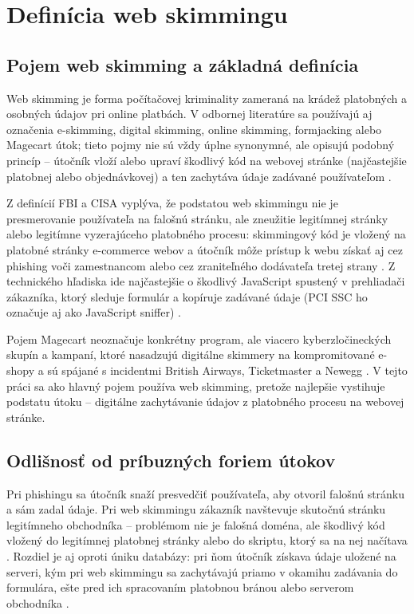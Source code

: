 \section{Definícia web skimmingu}

\subsection{Pojem web skimming a základná definícia}

Web skimming je forma počítačovej kriminality zameraná na krádež platobných a osobných údajov pri online platbách. V odbornej literatúre sa používajú aj označenia e-skimming, digital skimming, online skimming, formjacking alebo Magecart útok; tieto pojmy nie sú vždy úplne synonymné, ale opisujú podobný princíp -- útočník vloží alebo upraví škodlivý kód na webovej stránke (najčastejšie platobnej alebo objednávkovej) a ten zachytáva údaje zadávané používateľom \cite{europolDigitalSkimming,broadcomSymantecFormjacking}.

Z definícií FBI a CISA vyplýva, že podstatou web skimmingu nie je presmerovanie používateľa na falošnú stránku, ale zneužitie legitímnej stránky alebo legitímne vyzerajúceho platobného procesu: skimmingový kód je vložený na platobné stránky e-commerce webov a útočník môže prístup k webu získať aj cez phishing voči zamestnancom alebo cez zraniteľného dodávateľa tretej strany \cite{cisa2020eskimming,fbi2019eskimming}. Z technického hľadiska ide najčastejšie o škodlivý JavaScript spustený v prehliadači zákazníka, ktorý sleduje formulár a kopíruje zadávané údaje (PCI SSC ho označuje aj ako JavaScript sniffer) \cite{pciSsc2025PaymentPage}.

Pojem Magecart neoznačuje konkrétny program, ale viacero kyberzločineckých skupín a kampaní, ktoré nasadzujú digitálne skimmery na kompromitované e-shopy a sú spájané s incidentmi British Airways, Ticketmaster a Newegg \cite{fortinet2019MagecartSkimmer}. V tejto práci sa ako hlavný pojem používa web skimming, pretože najlepšie vystihuje podstatu útoku -- digitálne zachytávanie údajov z platobného procesu na webovej stránke.

\subsection{Odlišnosť od príbuzných foriem útokov}

Pri phishingu sa útočník snaží presvedčiť používateľa, aby otvoril falošnú stránku a sám zadal údaje. Pri web skimmingu zákazník navštevuje skutočnú stránku legitímneho obchodníka -- problémom nie je falošná doména, ale škodlivý kód vložený do legitímnej platobnej stránky alebo do skriptu, ktorý sa na nej načítava \cite{cisa2020eskimming,fbi2019eskimming}. Rozdiel je aj oproti úniku databázy: pri ňom útočník získava údaje uložené na serveri, kým pri web skimmingu sa zachytávajú priamo v okamihu zadávania do formulára, ešte pred ich spracovaním platobnou bránou alebo serverom obchodníka \cite{cisa2020eskimming,pciSsc2025PaymentPage}.


